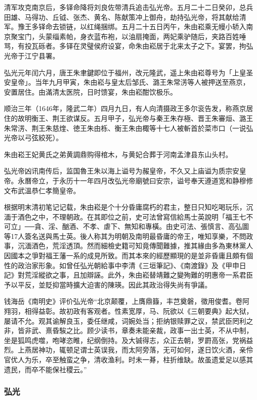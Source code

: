 清军攻克南京后，多铎命降将刘良佐带清兵追击弘光帝。五月二十二日癸卯，总兵田雄、马得功、丘钺、张杰、黄名、陈献策冲上御舟，劫持弘光帝，将其献给清军。豫王多铎命去锁链，以红绳捆绑。五月二十五日丙午，朱由崧乘无幔小轿入南京聚宝门，头蒙缁素帕，身衣蓝布袍，以油扇掩面，两妃乘驴随后，夹路百姓唾骂，有投瓦砾者。多铎在灵璧侯府设宴，命朱由崧居于北来太子之下。宴罢，拘弘光帝于江宁县署。

弘光元年闰六月，唐王朱聿鍵即位于福州，改元隆武，遥上朱由崧尊号为「上皇圣安皇帝」。当年九月甲寅，朱由崧与皇太后邹氏、潞王朱常淓等人被押送至燕京，安置居住。由滿清太医院，日时馈宴，朱由崧酣饮极乐。

顺治三年（1646年，隆武二年）四月九日，有人向清摄政王多尔衮告发，称燕京居住的故明衡王、荆王欲谋反。五月甲子，弘光帝与秦王朱存極、晋王朱審烜、潞王朱常淓、荆王朱慈煃、徳王朱由栎、衡王朱由棷等十七人被斬首於菜市口（一说弘光帝以弓弦絞死）。

朱由崧王妃黄氏之弟黄調鼎购得棺木，与黄妃合葬于河南孟津县东山头村。

弘光帝凶讯南传后，监国魯王朱以海上谥号为赧皇帝，不久又上庙谥为质宗安皇帝。永曆帝立，于永历十一年四月改弘光帝廟號曰安宗，谥号奉天遵道宽和静穆修文布武溫恭仁孝簡皇帝。

根据明末清初笔记记载，朱由崧是个十分昏庸腐朽的君主，整日只知吃喝玩乐，沉湎于酒色之中，不理朝政。在其即位之前，史可法曾寫信給馬士英說明「福王七不可立」──貪、淫、酗酒、不孝、虐下、無知和專橫。由史可法、張慎言、高弘圖等17人簽名送與馬士英。後人称其为明朝及南明最昏庸的帝王，唯知享樂，不問政事，沉湎酒色，荒淫透頂。然而細檢史籍可知竟傳聞難據，推其緣由多為東林黨人因國本之爭對福王藩一系的成見所致。而其本來的經歷顯現的是並非昏庸且頗有個性的政治家形象。如曾任弘光朝給事中李清《三垣筆記》、《南渡錄》及《甲申日記》對荒淫縱欲之事，且加辯誣。此外，朱由崧替靖難之變殉難的明惠帝一系君臣予以平反，並貶抑當時擴大迫害的陳瑛。因此其政治得失尚有爭議。

钱海岳《南明史》评价弘光帝“北京颠覆，上膺鼎籙，丰芑奠磐，徵用俊耆。卷阿翙羽，相得益彰。故初政有客观者。性素宽厚，马、阮欲以《三朝要典》起大狱，屡请不允。观其谕解良玉，委任继咸，词婉处当；拒纳银赎罪之议，禁武臣罔利之非，皆非武、熹昏騃之比。顾少读书，章奏未能亲裁，政事一出士英，不从中制，坐是狐鸣虎噬，咆哮恣睢，纪纲倒持。及大铖得志，众正去朝，罗罻高张，党祸益烈。上燕居神功，辄顿足谓士英误我，而太阿旁落，无可如何，遂日饮火酒，亲伶官优人为乐，卒至触蛮之争，清收渔利。时未一朞，柱折维缺。故虽遗爱足以感其遗民，而卒不能保社稷云。”

\subsubsection{弘光}

